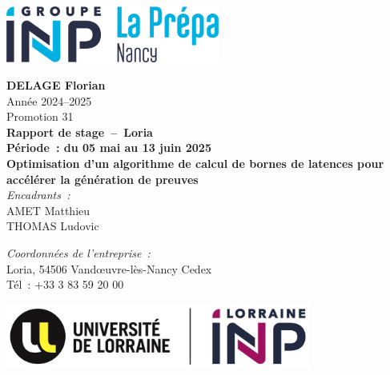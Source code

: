 \documentclass[12pt]{report}
\begin{document}

\begin{minipage}{0.5\textwidth}
    \includegraphics[width=7cm]{logo-prepa.png}
\end{minipage}
\hfill

\vspace{2cm}

\begin{center}
    \Large \textbf{DELAGE Florian} \\
    \vspace{0.5cm}
    \normalsize Année 2024--2025 \\
    Promotion 31 \\
    
    \vspace{1.5cm}
    \large \textbf{Rapport de stage\ --\ Loria} \\
    \textbf{Période : du 05 mai au 13 juin 2025} \\
    
    \vspace{1.5cm}
    \Huge \textbf{Optimisation d'un algorithme de calcul de bornes de latences pour accélérer la génération de preuves} \\
    
    \vspace{1.5cm}
    \normalsize \textit{Encadrants :} \\
    AMET Matthieu\\
    THOMAS Ludovic
    

    \vspace{1cm}
    \normalsize \textit{Coordonnées de l'entreprise :} \\
    Loria, 54506 Vandœuvre-lès-Nancy Cedex\\
    Tél : +33 3 83 59 20 00
\end{center}

\vfill

\begin{center}
    \begin{minipage}{\textwidth}
        \centering
        \includegraphics[width=10cm]{logo-l-inp.png}
    \end{minipage}
\end{center}
\thispagestyle{empty}
\end{document}
